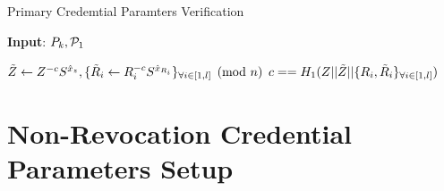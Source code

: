 \documentclass{article}
\begin{document}
\begin{algorithm}
\caption{Primary Credemtial Paramters Verification}
\label{alg:pcverify}
\hspace*{\algorithmicindent} \textbf{Input}: $P_{k}, \mathcal{P}_{1}$
\begin{algorithmic}
	\State $\tilde{Z}\leftarrow Z^{-c}S^{\hat{x}_{z}}, \{\tilde{R}_{i}\leftarrow R_{i}^{-c}S^{\hat{x}_{R_{i}}}\}_{\forall i\in [1,l]}\pmod{n}$
	\State \Return $c==H_{1}(Z||\tilde{Z}||\{R_i,\tilde{R}_i\}_{\forall i\in [1,l]})$
\end{algorithmic}
\end{algorithm}

\section{Non-Revocation Credential Parameters Setup}
\end{document}
